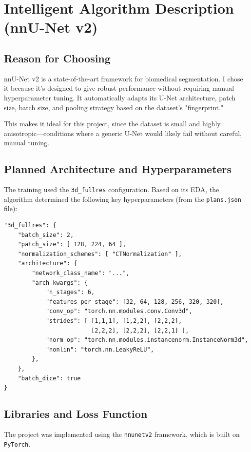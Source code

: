 \documentclass[11pt, a4paper]{article}
\begin{document}
\section{Intelligent Algorithm Description (nnU-Net v2)}

\subsection{Reason for Choosing}

nnU-Net v2 is a state-of-the-art framework for biomedical segmentation. I chose it because it's designed to give robust performance without requiring manual hyperparameter tuning. It automatically adapts its U-Net architecture, patch size, batch size, and pooling strategy based on the dataset's "fingerprint."

This makes it ideal for this project, since the dataset is small and highly anisotropic—conditions where a generic U-Net would likely fail without careful, manual tuning.

\subsection{Planned Architecture and Hyperparameters}

The training used the \texttt{3d\_fullres} configuration. Based on its EDA, the algorithm determined the following key hyperparameters (from the \texttt{plans.json} file):

\begin{verbatim}
"3d_fullres": {
    "batch_size": 2,
    "patch_size": [ 128, 224, 64 ],
    "normalization_schemes": [ "CTNormalization" ],
    "architecture": {
        "network_class_name": "...",
        "arch_kwargs": {
            "n_stages": 6,
            "features_per_stage": [32, 64, 128, 256, 320, 320],
            "conv_op": "torch.nn.modules.conv.Conv3d",
            "strides": [ [1,1,1], [1,2,2], [2,2,2], 
                         [2,2,2], [2,2,2], [2,2,1] ],
            "norm_op": "torch.nn.modules.instancenorm.InstanceNorm3d",
            "nonlin": "torch.nn.LeakyReLU",
        },
    },
    "batch_dice": true
}
\end{verbatim}

\subsection{Libraries and Loss Function}
The project was implemented using the \texttt{nnunetv2} framework, which is built on \texttt{PyTorch}.
\end{document}
